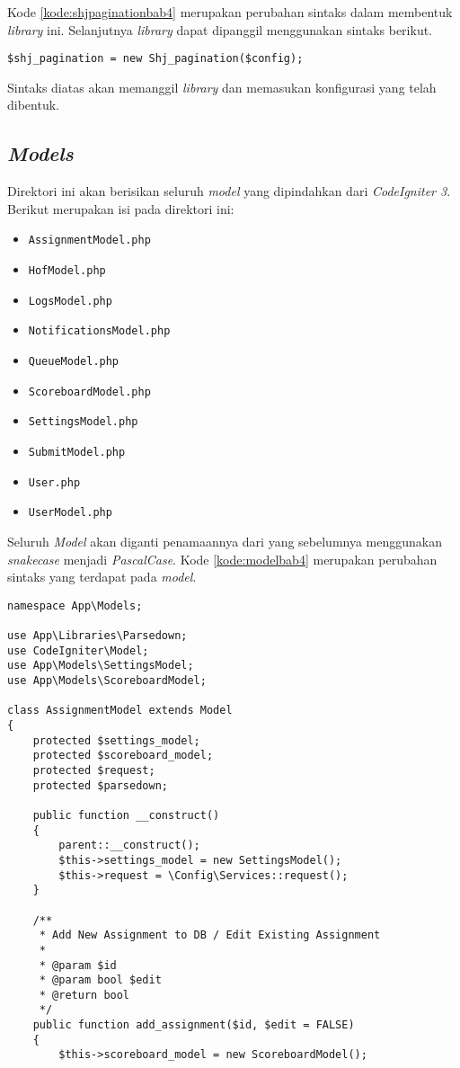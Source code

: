 Kode \ref{kode:shjpaginationbab4} merupakan perubahan sintaks dalam membentuk \textit{library} ini. Selanjutnya \textit{library} dapat dipanggil menggunakan sintaks berikut.

\begin{center}
\verb|$shj_pagination = new Shj_pagination($config);|
\end{center}

Sintaks diatas akan memanggil \textit{library} dan memasukan konfigurasi yang telah dibentuk.

\subsection{\textit{Models}}
Direktori ini akan berisikan seluruh \textit{model} yang dipindahkan dari \textit{CodeIgniter 3}. Berikut merupakan isi pada direktori ini:
\begin{itemize}
	\item \texttt{AssignmentModel.php}
	\item \texttt{HofModel.php}
	\item \texttt{LogsModel.php}
	\item \texttt{NotificationsModel.php}
	\item \texttt{QueueModel.php}
	\item \texttt{ScoreboardModel.php}
	\item \texttt{SettingsModel.php}
	\item \texttt{SubmitModel.php}
	\item \texttt{User.php}
	\item \texttt{UserModel.php}
\end{itemize}

Seluruh \textit{Model} akan diganti penamaannya dari yang sebelumnya menggunakan \textit{snakecase} menjadi \textit{PascalCase}. Kode \ref{kode:modelbab4} merupakan perubahan sintaks yang terdapat pada \textit{model}.

\begin{lstlisting}[caption=Perancangan perubahan \textit{model} pada \textit{CodeIgniter 4}, label=kode:modelbab4]
namespace App\Models;

use App\Libraries\Parsedown;
use CodeIgniter\Model;
use App\Models\SettingsModel;
use App\Models\ScoreboardModel;

class AssignmentModel extends Model
{
	protected $settings_model;
	protected $scoreboard_model;
	protected $request;
	protected $parsedown;

	public function __construct()
	{
		parent::__construct();
		$this->settings_model = new SettingsModel();
		$this->request = \Config\Services::request(); 
	}

	/**
	 * Add New Assignment to DB / Edit Existing Assignment
	 *
	 * @param $id
	 * @param bool $edit
	 * @return bool
	 */
	public function add_assignment($id, $edit = FALSE)
	{	
		$this->scoreboard_model = new ScoreboardModel();
\end{lstlisting}

